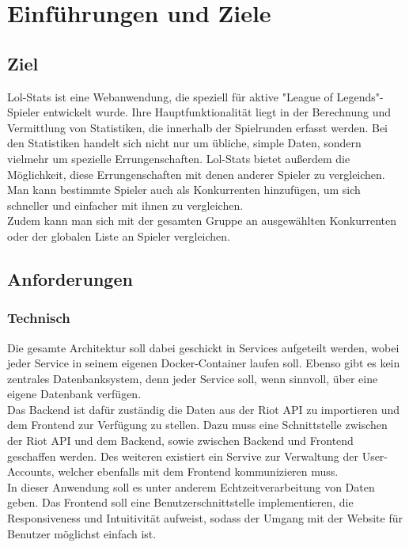 \section{Einführungen und Ziele}
\subsection{Ziel}

Lol-Stats ist eine Webanwendung, die speziell für aktive "League of Legends"-Spieler entwickelt wurde. Ihre Hauptfunktionalität liegt in der Berechnung und Vermittlung
von Statistiken, die innerhalb der Spielrunden erfasst werden. Bei den Statistiken handelt sich nicht nur um übliche, simple Daten, sondern vielmehr um spezielle Errungenschaften. 
Lol-Stats bietet außerdem die Möglichkeit, diese Errungenschaften mit denen anderer Spieler zu vergleichen. Man kann bestimmte Spieler auch als Konkurrenten hinzufügen, um sich schneller und einfacher mit ihnen zu vergleichen.\\
Zudem kann man sich mit der gesamten Gruppe an ausgewählten Konkurrenten oder der globalen Liste an Spieler vergleichen.

\subsection{Anforderungen}

\subsubsection{Technisch}

Die gesamte Architektur soll dabei geschickt in Services aufgeteilt werden, wobei jeder Service in seinem eigenen Docker-Container laufen soll.
Ebenso gibt es kein zentrales Datenbanksystem, denn jeder Service soll, wenn sinnvoll, über eine eigene Datenbank verfügen.\\
Das Backend ist dafür zuständig die Daten aus der Riot API zu importieren und dem Frontend zur Verfügung zu stellen. Dazu muss eine Schnittstelle zwischen der Riot API und dem Backend, sowie zwischen Backend und Frontend geschaffen werden. Des weiteren existiert ein Servive zur Verwaltung der User-Accounts, welcher ebenfalls mit dem Frontend kommunizieren muss.\\
In dieser Anwendung soll es unter anderem Echtzeitverarbeitung von Daten geben.
Das Frontend soll eine Benutzerschnittstelle implementieren, die Responsiveness und Intuitivität aufweist, sodass der Umgang mit der Website für Benutzer möglichst einfach ist.

